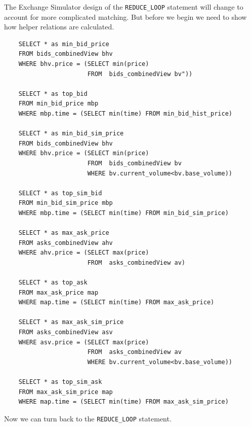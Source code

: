 \documentclass{article}
\begin{document}
The Exchange Simulator design of the {\tt REDUCE\_LOOP} statement will change to account for more complicated matching. But before we begin we need to show how helper relations are calculated.

\begin{verbatim}      
    SELECT * as min_bid_price
    FROM bids_combinedView bhv
    WHERE bhv.price = (SELECT min(price) 
                       FROM  bids_combinedView bv"))
    
    SELECT * as top_bid
    FROM min_bid_price mbp
    WHERE mbp.time = (SELECT min(time) FROM min_bid_hist_price)
    
    SELECT * as min_bid_sim_price
    FROM bids_combinedView bhv
    WHERE bhv.price = (SELECT min(price) 
                       FROM  bids_combinedView bv
                       WHERE bv.current_volume<bv.base_volume))
    
    SELECT * as top_sim_bid
    FROM min_bid_sim_price mbp
    WHERE mbp.time = (SELECT min(time) FROM min_bid_sim_price)
    
    SELECT * as max_ask_price
    FROM asks_combinedView ahv
    WHERE ahv.price = (SELECT max(price) 
                       FROM  asks_combinedView av)
    
    SELECT * as top_ask
    FROM max_ask_price map
    WHERE map.time = (SELECT min(time) FROM max_ask_price)
    
    SELECT * as max_ask_sim_price
    FROM asks_combinedView asv
    WHERE asv.price = (SELECT max(price) 
                       FROM  asks_combinedView av
                       WHERE bv.current_volume<bv.base_volume))
    
    SELECT * as top_sim_ask
    FROM max_ask_sim_price map
    WHERE map.time = (SELECT min(time) FROM max_ask_sim_price)
\end{verbatim}

Now we can turn back to the {\tt REDUCE\_LOOP} statement.
\end{document}
